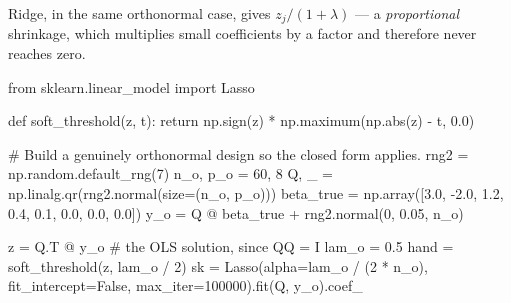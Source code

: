 \documentclass[
  letterpaper,
  10pt,
  twoside,
  openright,
  numbers=noenddot,
  chapterprefix=true]{scrbook}
\newenvironment{Shaded}{}{}
\newcommand{\BuiltInTok}[1]{\textcolor[rgb]{0.84,0.23,0.29}{#1}}
\newcommand{\CommentTok}[1]{\textcolor[rgb]{0.42,0.45,0.49}{#1}}
\newcommand{\ControlFlowTok}[1]{\textcolor[rgb]{0.84,0.23,0.29}{#1}}
\newcommand{\DecValTok}[1]{\textcolor[rgb]{0.00,0.36,0.77}{#1}}
\newcommand{\FloatTok}[1]{\textcolor[rgb]{0.00,0.36,0.77}{#1}}
\newcommand{\ImportTok}[1]{\textcolor[rgb]{0.01,0.18,0.38}{#1}}
\newcommand{\KeywordTok}[1]{\textcolor[rgb]{0.84,0.23,0.29}{#1}}
\newcommand{\NormalTok}[1]{\textcolor[rgb]{0.14,0.16,0.18}{#1}}
\newcommand{\OperatorTok}[1]{\textcolor[rgb]{0.14,0.16,0.18}{#1}}
\newcommand{\VariableTok}[1]{\textcolor[rgb]{0.89,0.38,0.04}{#1}}
\begin{document}
Ridge, in the same orthonormal case, gives \(z_j / (1 + \lambda)\) --- a
\emph{proportional} shrinkage, which multiplies small coefficients by a
factor and therefore never reaches zero.

\label{check-soft-threshold}
\begin{Shaded}
\begin{Highlighting}[]
\ImportTok{from}\NormalTok{ sklearn.linear\_model }\ImportTok{import}\NormalTok{ Lasso}

\KeywordTok{def}\NormalTok{ soft\_threshold(z, t):}
    \ControlFlowTok{return}\NormalTok{ np.sign(z) }\OperatorTok{*}\NormalTok{ np.maximum(np.}\BuiltInTok{abs}\NormalTok{(z) }\OperatorTok{{-}}\NormalTok{ t, }\FloatTok{0.0}\NormalTok{)}

\CommentTok{\# Build a genuinely orthonormal design so the closed form applies.}
\NormalTok{rng2 }\OperatorTok{=}\NormalTok{ np.random.default\_rng(}\DecValTok{7}\NormalTok{)}
\NormalTok{n\_o, p\_o }\OperatorTok{=} \DecValTok{60}\NormalTok{, }\DecValTok{8}
\NormalTok{Q, \_ }\OperatorTok{=}\NormalTok{ np.linalg.qr(rng2.normal(size}\OperatorTok{=}\NormalTok{(n\_o, p\_o)))}
\NormalTok{beta\_true }\OperatorTok{=}\NormalTok{ np.array([}\FloatTok{3.0}\NormalTok{, }\OperatorTok{{-}}\FloatTok{2.0}\NormalTok{, }\FloatTok{1.2}\NormalTok{, }\FloatTok{0.4}\NormalTok{, }\FloatTok{0.1}\NormalTok{, }\FloatTok{0.0}\NormalTok{, }\FloatTok{0.0}\NormalTok{, }\FloatTok{0.0}\NormalTok{])}
\NormalTok{y\_o }\OperatorTok{=}\NormalTok{ Q }\OperatorTok{@}\NormalTok{ beta\_true }\OperatorTok{+}\NormalTok{ rng2.normal(}\DecValTok{0}\NormalTok{, }\FloatTok{0.05}\NormalTok{, n\_o)}

\NormalTok{z }\OperatorTok{=}\NormalTok{ Q.T }\OperatorTok{@}\NormalTok{ y\_o                      }\CommentTok{\# the OLS solution, since Q\textquotesingle{}Q = I}
\NormalTok{lam\_o }\OperatorTok{=} \FloatTok{0.5}
\NormalTok{hand }\OperatorTok{=}\NormalTok{ soft\_threshold(z, lam\_o }\OperatorTok{/} \DecValTok{2}\NormalTok{)}
\NormalTok{sk }\OperatorTok{=}\NormalTok{ Lasso(alpha}\OperatorTok{=}\NormalTok{lam\_o }\OperatorTok{/}\NormalTok{ (}\DecValTok{2} \OperatorTok{*}\NormalTok{ n\_o), fit\_intercept}\OperatorTok{=}\VariableTok{False}\NormalTok{, max\_iter}\OperatorTok{=}\DecValTok{100000}\NormalTok{).fit(Q, y\_o).coef\_}


\end{Highlighting}
\end{Shaded}
\end{document}
